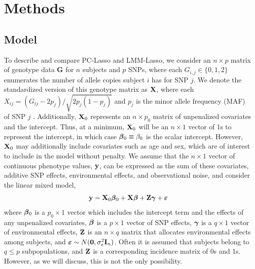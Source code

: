 \section{Methods} \label{sec:methods}



\subsection{Model}

To describe and compare PC-Lasso and LMM-Lasso, we consider an $n \times p$ matrix of genotype data $\boldsymbol{G}$ for $n$ subjects and $p$ SNPs, where each $G_{i,j} \in \{ 0, 1, 2 \}$ enumerates the number of allele copies subject $i$ has for SNP $j$. We denote the standardized version of this genotype matrix as $\textbf{X}$, where each $X_{ij} = (G_{ij} - 2 p_j) / \sqrt{2 p_j (1 - p_j)}$ and $p_j$ is the minor allele frequency (MAF) of SNP $j$ \citep{zhang2015principal, price2006principal}. Additionally, $\textbf{X}_0$ represents an $n \times p_0$ matrix of unpenalized covariates and the intercept. Thus, at a minimum, $\textbf{X}_0$ will be an $n \times 1$ vector of 1s to represent the intercept, in which case $\boldsymbol{\beta}{}_0 \equiv \beta_0$ is the scalar intercept. However, $\textbf{X}_0$ may additionally include covariates such as age and sex, which are of interest to include in the model without penalty. We assume that the $n \times 1$ vector of continuous phenotype values, $\textbf{y}$, can be expressed as the sum of these covariates, additive SNP effects, environmental effects, and observational noise, and consider the linear mixed model,
\begin{equation}
    \label{eqn:model}
    \textbf{y} = \textbf{X}_0 \boldsymbol{\beta}{}_0 + \textbf{X}\boldsymbol{\beta}{} + \textbf{Z}\boldsymbol{\gamma} + \boldsymbol{\varepsilon}{}
\end{equation}
where $\boldsymbol{\beta}{}_0$ is a $p_0 \times 1$ vector which includes the intercept term and the effects of any unpenalized covariates, $\boldsymbol{\beta}{}$ is a $p \times 1$ vector of SNP effects, $\boldsymbol{\gamma}$ is a $q \times 1$ vector of environmental effects, $\textbf{Z}$ is an $n \times q$ matrix that allocates environmental effects among subjects, and $\boldsymbol{\varepsilon}{} \sim N(\boldsymbol{0}, \sigma^2_e \textbf{I}_n)$. Often it is assumed that subjects belong to $q \le p$ subpopulations, and $\textbf{Z}$ is a corresponding incidence matrix of 0s and 1s. However, as we will discuss, this is not the only possibility.

